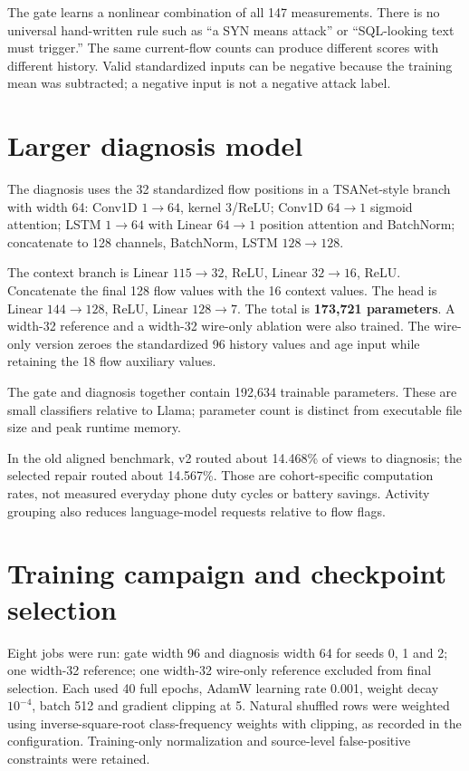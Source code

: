 \documentclass[11pt,a4paper,oneside]{report}
\begin{document}
The gate learns a nonlinear combination of all 147 measurements. There is no universal hand-written rule such as ``a SYN means attack'' or ``SQL-looking text must trigger.'' The same current-flow counts can produce different scores with different history. Valid standardized inputs can be negative because the training mean was subtracted; a negative input is not a negative attack label.

\section{Larger diagnosis model}
The diagnosis uses the 32 standardized flow positions in a TSANet-style branch with width 64: Conv1D $1\to64$, kernel 3/ReLU; Conv1D $64\to1$ sigmoid attention; LSTM $1\to64$ with Linear $64\to1$ position attention and BatchNorm; concatenate to 128 channels, BatchNorm, LSTM $128\to128$.

The context branch is Linear $115\to32$, ReLU, Linear $32\to16$, ReLU. Concatenate the final 128 flow values with the 16 context values. The head is Linear $144\to128$, ReLU, Linear $128\to7$. The total is \textbf{173,721 parameters}. A width-32 reference and a width-32 wire-only ablation were also trained. The wire-only version zeroes the standardized 96 history values and age input while retaining the 18 flow auxiliary values.

The gate and diagnosis together contain 192,634 trainable parameters. These are small classifiers relative to Llama; parameter count is distinct from executable file size and peak runtime memory.

In the old aligned benchmark, v2 routed about 14.468\% of views to diagnosis; the selected repair routed about 14.567\%. Those are cohort-specific computation rates, not measured everyday phone duty cycles or battery savings. Activity grouping also reduces language-model requests relative to flow flags.

\section{Training campaign and checkpoint selection}
Eight jobs were run: gate width 96 and diagnosis width 64 for seeds 0, 1 and 2; one width-32 reference; one width-32 wire-only reference excluded from final selection. Each used 40 full epochs, AdamW learning rate 0.001, weight decay $10^{-4}$, batch 512 and gradient clipping at 5. Natural shuffled rows were weighted using inverse-square-root class-frequency weights with clipping, as recorded in the configuration. Training-only normalization and source-level false-positive constraints were retained.
\end{document}

